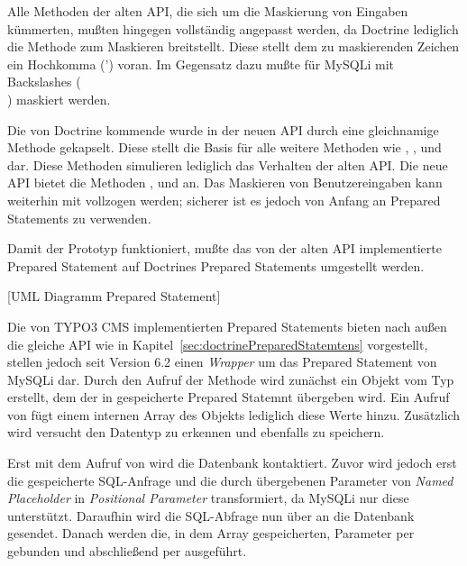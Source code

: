 Alle Methoden der alten API, die sich um die Maskierung von Eingaben kümmerten, mußten hingegen vollständig angepasst werden, da Doctrine lediglich die Methode  zum Maskieren breitstellt. Diese stellt dem zu maskierenden Zeichen ein Hochkomma (') voran. Im Gegensatz dazu mußte für MySQLi mit Backslashes (\\) maskiert werden.

Die von Doctrine kommende  wurde in der neuen API durch eine gleichnamige Methode gekapselt. Diese stellt die Basis für alle weitere Methoden wie , ,  und  dar. Diese Methoden simulieren lediglich das Verhalten der alten API. Die neue API bietet die Methoden ,  und  an. Das Maskieren von Benutzereingaben kann weiterhin mit  vollzogen werden; sicherer ist es jedoch von Anfang an Prepared Statements zu verwenden.

Damit der Prototyp funktioniert, mußte das von der alten API implementierte Prepared Statement auf Doctrines Prepared Statements umgestellt werden.

[UML Diagramm Prepared Statement]

Die von TYPO3 CMS implementierten Prepared Statements bieten nach außen die gleiche API wie in Kapitel~\ref{sec:doctrinePreparedStatemtens} vorgestellt, stellen jedoch seit Version 6.2 einen \textit{Wrapper} um das Prepared Statement von MySQLi dar. Durch den Aufruf der Methode  wird zunächst ein Objekt vom Typ  erstellt, dem der in  gespeicherte Prepared Statemnt übergeben wird.
Ein Aufruf von  fügt einem internen Array des Objekts lediglich diese Werte hinzu. Zusätzlich wird versucht den Datentyp zu erkennen und ebenfalls zu speichern.

Erst mit dem Aufruf von  wird die Datenbank kontaktiert. Zuvor wird jedoch erst die gespeicherte SQL-Anfrage und die durch  übergebenen Parameter von \textit{Named Placeholder} in \textit{Positional Parameter} transformiert, da MySQLi nur diese unterstützt. Daraufhin wird die SQL-Abfrage nun über  an die Datenbank gesendet. Danach werden die, in dem Array gespeicherten, Parameter per  gebunden und abschließend per  ausgeführt.

